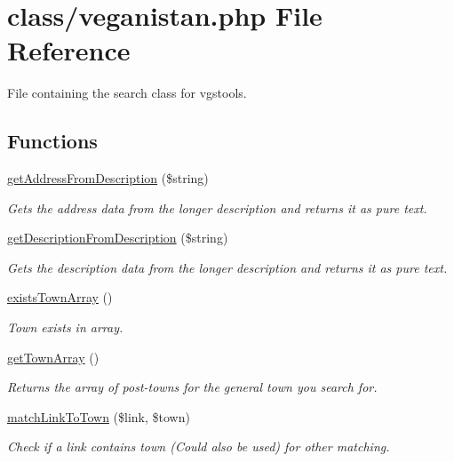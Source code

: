 \hypertarget{veganistan_8php}{}\section{class/veganistan.php File Reference}
\label{veganistan_8php}


File containing the search class for vgstools.  


\subsection*{Functions}
\begin{DoxyCompactItemize}
\item 
\hyperlink{veganistan_8php_af1239b1ab4bb8b28bde609484b92de75}{get\+Address\+From\+Description} (\$string)
\begin{DoxyCompactList}\small\item\em Gets the address data from the longer description and returns it as pure text. \end{DoxyCompactList}\item 
\hyperlink{veganistan_8php_ab53c3963282815bfc5db50f03053c497}{get\+Description\+From\+Description} (\$string)
\begin{DoxyCompactList}\small\item\em Gets the description data from the longer description and returns it as pure text. \end{DoxyCompactList}\item 
\hyperlink{veganistan_8php_ab9d8d11d7c212098c40df90c702d02e0}{exists\+Town\+Array} ()
\begin{DoxyCompactList}\small\item\em Town exists in array. \end{DoxyCompactList}\item 
\hyperlink{veganistan_8php_a80deef1c368c57a83751d69eee0f9bec}{get\+Town\+Array} ()
\begin{DoxyCompactList}\small\item\em Returns the array of post-\/towns for the general town you search for. \end{DoxyCompactList}\item 
\hyperlink{veganistan_8php_a036078d10f25b186e72c0a54943dc077}{match\+Link\+To\+Town} (\$link, \$town)
\begin{DoxyCompactList}\small\item\em Check if a link contains town (Could also be used) for other matching. \end{DoxyCompactList}\item 

\end{DoxyCompactItemize}
